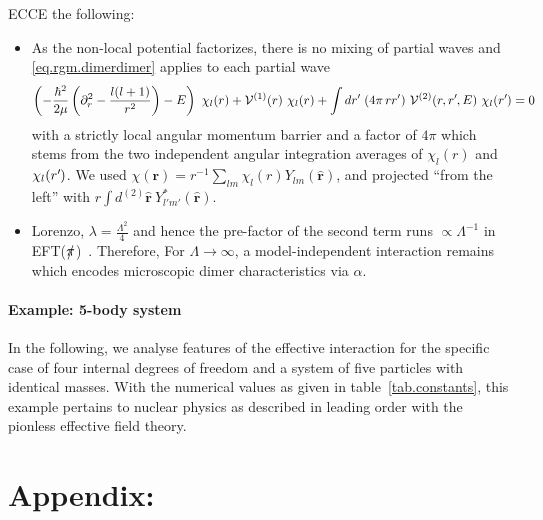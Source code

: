 \documentclass[onecolumn,preprint,superscriptaddress,nofootinbib,notitlepage,10pt,linenumbers]{revtex4-1}
\newcommand*{\mprime}{^{\prime}\mkern-1.2mu}
\newcommand{\eftnopi}{\mbox{EFT($\slashed{\pi}$) }}
\newcommand{\la}{\label}
\newcommand{\be}{\begin{equation}}
\newcommand{\ee}{\end{equation}}
\newcommand{\ve}[1]{\ensuremath{\boldsymbol{#1}}}
\begin{document}
ECCE the following:
\begin{itemize}
\item As the non-local potential factorizes, there is no mixing of partial waves and \eqref{eq.rgm.dimerdimer} applies to each partial wave
\be\la{eq.rgm.dimerdimer.pw}
\left(-\frac{\hbar^2}{2\mu}\left(\partial_r^2-\frac{l(l+1)}{r^2}\right)-E\right)~\chi_l(r)+\mathcal{V}^{(1)}(r)~\chi_l(r)+
\int dr\mprime~(4\pi\,rr')~\mathcal{V}^{(2)}(r,r\mprime,E)~\chi_l(r\mprime)=0
\ee
with a strictly local angular momentum barrier and a factor of $4\pi$ which stems from the two independent angular integration averages
of $\chi_l(r)$ and $\chi_l(r\mprime)$. We used $\chi(\ve{r})=r^{-1}\sum_{lm}\chi_l(r)Y_{lm}(\hat{\ve{r}})$, and projected ``from the left''
with $r\int d^{(2)}\hat{\ve{r}}~Y^*_{l'm'}(\hat{\ve{r}})$.

\item Lorenzo, $\lambda=\frac{\Lambda^2}{4}$ and hence the pre-factor of the second term runs $\propto\Lambda^{-1}$ in \eftnopi. Therefore,
For $\Lambda\to\infty$, a model-independent interaction remains which encodes microscopic dimer characteristics via $\alpha$.
\end{itemize}


\newpage
\paragraph{Example: 5-body system}
In the following, we analyse features of the effective interaction for the
specific case of four internal degrees of freedom and a system of five particles
with identical masses. With the numerical values as given in table~\ref{tab.constants},
this example pertains to nuclear physics as described in leading order with the
pionless effective field theory.


\newpage


\section{Appendix: }
\end{document}
